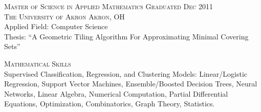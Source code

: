 \documentclass[letterpaper, 11pt]{article} %
\begin{document}



\hrulefill

\textsc{Master of Science in Applied Mathematics} \hfill \textsc{Graduated Dec 2011} \\
\textsc{The University of Akron \hfill Akron, OH} \\
Applied Field: Computer Science \\
Thesis: ``A Geometric Tiling Algorithm For Approximating Minimal Covering Sets'' \




\hrulefill

\textsc{Mathematical Skills} \\
    Supervised Classification, Regression, and Clustering Models:
    Linear/Logistic Regression,
    Support Vector Machines,
    Ensemble/Boosted Decision Trees,
    Neural Networks,
    Linear Algebra,
    Numerical Computation,
    Partial Differential Equations,
    Optimization,
    Combinatorics,
    Graph Theory,
    Statistics.
    
\end{document}
